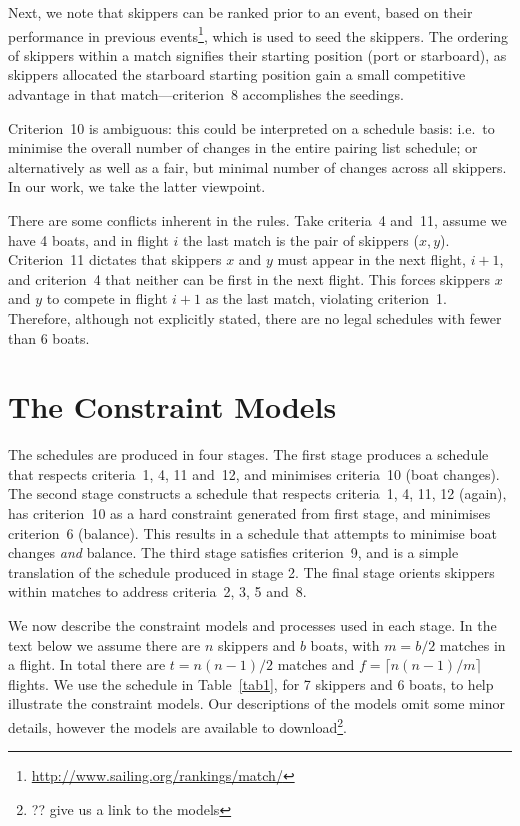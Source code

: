 \documentclass{llncs}
\begin{document}
Next, we note that skippers can be ranked prior to an event, based on their performance in
previous events\footnote{\url{http://www.sailing.org/rankings/match/}}, which is used to seed the
skippers. The ordering of skippers within a match signifies their starting position (port or
starboard), as skippers allocated the starboard starting position gain a small competitive
advantage in that match---criterion~8 accomplishes the seedings.

Criterion~10 is ambiguous: this could be interpreted on a schedule basis: i.e.\ to minimise the
overall number of changes in the entire pairing list schedule; or alternatively as well as a fair,
but minimal number of changes across all skippers. In our work, we take the latter viewpoint.

There are some conflicts inherent in the rules. Take criteria~4 and~11, assume we have 4 boats, and
in flight $i$ the last match is the pair of skippers ($x,y$). Criterion~11 dictates that skippers $x$
and $y$ must appear in the next flight, $i+1$, and criterion~4 that neither can be first in the next
flight. This forces skippers $x$ and $y$ to compete in flight $i+1$ as the last match, violating
criterion~1. Therefore, although not explicitly stated, there are no legal schedules with fewer than 6
boats.

\section{The Constraint Models}\label{sec:models}

The schedules are produced in four stages. The first stage produces a schedule that respects
criteria~1, 4, 11 and~12, and minimises criteria~10 (boat changes). The second stage constructs a
schedule that respects criteria~1, 4, 11, 12 (again), has criterion~10 as a hard constraint generated
from first stage, and minimises criterion~6 (balance). This results in a schedule that attempts to
minimise boat changes \emph{and} balance. The third stage satisfies criterion~9, and is a simple
translation of the schedule produced in stage 2.  The final stage orients skippers within matches to
address criteria~2, 3, 5 and~8.

We now describe the constraint models and processes used in each stage. In the text below we assume
there are $n$ skippers and $b$ boats, with $m = b/2$ matches in a flight. In total there are $t =
n(n-1)/2$ matches and $f = \lceil n(n-1)/m  \rceil$ flights. We use the schedule in
Table~\ref{tab1}, for 7 skippers and 6 boats, to help illustrate the constraint models. Our
descriptions of the models omit some minor details, however the models are available to
download\footnote{?? give us a link to the models}.
\end{document}

